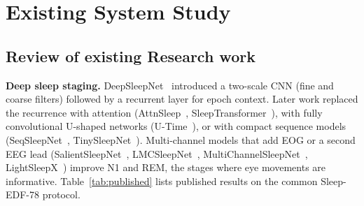 \label{chap.2}

\section{Existing System Study}
\subsection{Review of existing Research work}

\textbf{Deep sleep staging.} DeepSleepNet~\cite{supratak2017deepsleepnet} introduced a two-scale CNN (fine and
coarse filters) followed by a recurrent layer for epoch context. Later work replaced the recurrence with attention
(AttnSleep~\cite{eldele2021attnsleep}, SleepTransformer~\cite{phan2022sleeptransformer}), with fully convolutional
U-shaped networks (U-Time~\cite{perslev2019utime}), or with compact sequence models
(SeqSleepNet~\cite{phan2019seqsleepnet}, TinySleepNet~\cite{supratak2020tinysleepnet}). Multi-channel models that add
EOG or a second EEG lead (SalientSleepNet~\cite{salientsleepnet}, LMCSleepNet~\cite{lmcsleepnet},
MultiChannelSleepNet~\cite{multichannelsleepnet}, LightSleepX~\cite{lightsleepx}) improve N1 and REM, the stages
where eye movements are informative. Table~\ref{tab:published} lists published results on the common Sleep-EDF-78
protocol.

